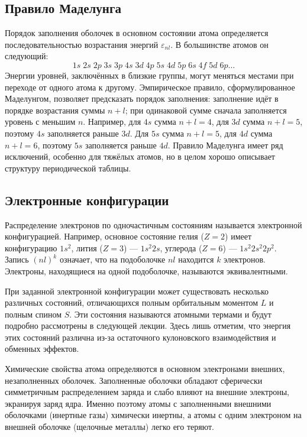 \documentclass[a4paper, 12pt]{article}
\numberwithin{equation}{section}
\begin{document}
\subsection{Правило Маделунга}
\label{subsec:madelung_rule}

Порядок заполнения оболочек в основном состоянии атома определяется последовательностью возрастания энергий $\varepsilon_{nl}$. В большинстве атомов он следующий:
\begin{equation}
\label{eq:filling_order}
1s \; 2s \; 2p \; 3s \; 3p \; 4s \; 3d \; 4p \; 5s \; 4d \; 5p \; 6s \; 4f \; 5d \; 6p \dots
\end{equation}
Энергии уровней, заключённых в близкие группы, могут меняться местами при переходе от одного атома к другому. Эмпирическое правило, сформулированное Маделунгом, позволяет предсказать порядок заполнения: заполнение идёт в порядке возрастания суммы $n+l$; при одинаковой сумме сначала заполняется уровень с меньшим $n$. Например, для $4s$ сумма $n+l = 4$, для $3d$ сумма $n+l = 5$, поэтому $4s$ заполняется раньше $3d$. Для $5s$ сумма $n+l = 5$, для $4d$ сумма $n+l = 6$, поэтому $5s$ заполняется раньше $4d$. Правило Маделунга имеет ряд исключений, особенно для тяжёлых атомов, но в целом хорошо описывает структуру периодической таблицы.

\subsection{Электронные конфигурации}
\label{subsec:electronic_configurations}

Распределение электронов по одночастичным состояниям называется электронной конфигурацией. Например, основное состояние гелия ($Z=2$) имеет конфигурацию $1s^2$, лития ($Z=3$) --- $1s^2 2s$, углерода ($Z=6$) --- $1s^2 2s^2 2p^2$. Запись $(nl)^k$ означает, что на подоболочке $nl$ находится $k$ электронов. Электроны, находящиеся на одной подоболочке, называются эквивалентными.

При заданной электронной конфигурации может существовать несколько различных состояний, отличающихся полным орбитальным моментом $L$ и полным спином $S$. Эти состояния называются атомными термами и будут подробно рассмотрены в следующей лекции. Здесь лишь отметим, что энергия этих состояний различна из-за остаточного кулоновского взаимодействия и обменных эффектов.

Химические свойства атома определяются в основном электронами внешних, незаполненных оболочек. Заполненные оболочки обладают сферически симметричным распределением заряда и слабо влияют на внешние электроны, экранируя заряд ядра. Именно поэтому атомы с заполненными внешними оболочками (инертные газы) химически инертны, а атомы с одним электроном на внешней оболочке (щелочные металлы) легко его теряют.
\end{document}
